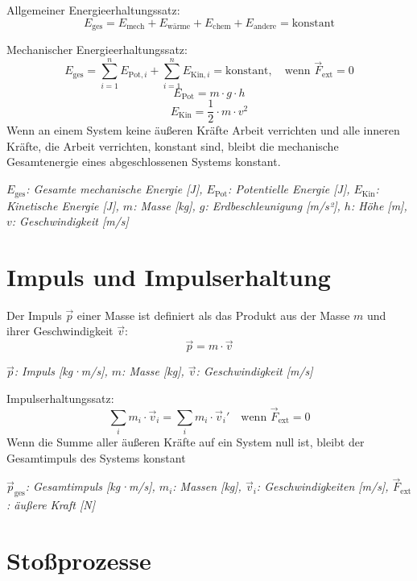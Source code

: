 \documentclass[a4paper,10pt]{article}
\newenvironment{displayformula}
{
	\begin{framed}
		\color{formulaColor}
	}
	{\end{framed}}
\newcommand{\formulalegend}[1]{%
	\par\vspace{0.5ex}%
	{{\color{legendColor}\RaggedRight\small\textit{#1}}}%
	\par\vspace{1.5ex}%
}
\begin{document}
\begin{displayformula}
	Allgemeiner Energieerhaltungssatz: 
	\[
	E_{\text{ges}} = E_{\text{mech}} + E_{\text{wärme}} + E_{\text{chem}} + E_{\text{andere}} = \text{konstant}
	\]
\end{displayformula}

\begin{displayformula}
	Mechanischer Energieerhaltungssatz:
	\[
	E_{\text{ges}} = \sum_{i=1}^{n} E_{\text{Pot}, i} + \sum_{i=1}^{n} E_{\text{Kin}, i} = \text{konstant}, \quad \text{wenn } \vec{F}_{\text{ext}} = 0
	\]
	\[
	E_{\text{Pot}} = m \cdot g \cdot h
	\]
	\[
	E_{\text{Kin}} = \frac{1}{2} \cdot m \cdot v^2
	\]
	Wenn an einem System keine äußeren Kräfte Arbeit verrichten und alle inneren Kräfte, die Arbeit verrichten, konstant sind, bleibt die mechanische Gesamtenergie eines abgeschlossenen Systems konstant.
\end{displayformula}
\formulalegend{
	\( E_{\text{ges}} \): Gesamte mechanische Energie [J], \( E_{\text{Pot}} \): Potentielle Energie [J], \( E_{\text{Kin}} \): Kinetische Energie [J], \( m \): Masse [kg], \( g \): Erdbeschleunigung [m/s²], \( h \): Höhe [m], \( v \): Geschwindigkeit [m/s]
}

\section{Impuls und Impulserhaltung}

\begin{displayformula}
	Der Impuls \( \vec{p} \) einer Masse ist definiert als das Produkt aus der Masse \( m \) und ihrer Geschwindigkeit \( \vec{v} \):
	\[
	\vec{p} = m \cdot \vec{v}
	\]
\end{displayformula}
\formulalegend{
	\( \vec{p} \): Impuls [kg·m/s], \( m \): Masse [kg], \( \vec{v} \): Geschwindigkeit [m/s]
}

\begin{displayformula}
	Impulserhaltungssatz:
	\[
	 \sum_i m_i \cdot \vec{v}_i = \sum_i m_i \cdot \vec{v}_i ' \quad \text{wenn } \vec{F}_{\text{ext}} = 0
	\]
	Wenn die Summe aller äußeren Kräfte auf ein System null ist, bleibt der Gesamtimpuls des Systems konstant
\end{displayformula}
\formulalegend{
	\( \vec{p}_{\text{ges}} \): Gesamtimpuls [kg·m/s], \( m_i \): Massen [kg], \( \vec{v}_i \): Geschwindigkeiten [m/s], \( \vec{F}_{\text{ext}} \): äußere Kraft [N]
}

\section{Stoßprozesse}
\end{document}
